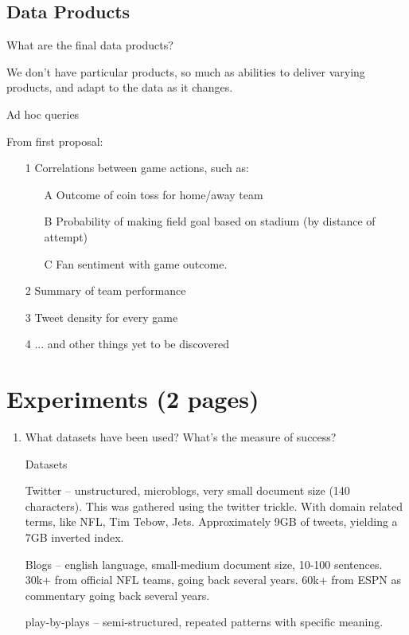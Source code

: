 \documentclass{article}
\begin{document}
\begin{enumerate}
  \subsection{Data Products}
  What are the final data products?

  We don't have particular products, so much as abilities to deliver varying products, and adapt to the data as it changes.

  Ad hoc queries

  From first proposal:
  \begin{enumerate}
  \item[1] Correlations between game actions, such as:
    \begin{enumerate}
    \item[A] Outcome of coin toss for home/away team
    \item[B] Probability of making field goal based on
      stadium (by distance of attempt)
    \item[C] Fan sentiment with game outcome.
    \end{enumerate}
  \item[2] Summary of team performance
  \item[3] Tweet density for every game
  \item[4] ... and other things yet to be discovered
  \end{enumerate}




  \section{Experiments (2 pages)}
  \begin{enumerate}
  \item What datasets have been used? What’s the measure of success?

    Datasets

    Twitter -- unstructured, microblogs, very small document size (140 characters). This was gathered using the twitter trickle. With domain related terms, like NFL, Tim Tebow, Jets.
    Approximately 9GB of tweets, yielding a 7GB inverted index.

    Blogs -- english language, small-medium document size, 10-100 sentences.
    30k+ from official NFL teams, going back several years.
    60k+ from ESPN as commentary going back several years.

    play-by-plays -- semi-structured, repeated patterns with specific meaning.



\end{enumerate}
\end{enumerate}
\end{document}
